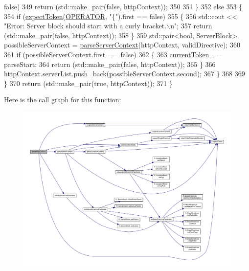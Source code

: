 \begin{DoxyCode}
{      false})
349                     \textcolor{keywordflow}{return} (std::make\_pair(\textcolor{keyword}{false}, httpContext));
350                 
351             \}
352             \textcolor{keywordflow}{else}
353             \{
354                 \textcolor{keywordflow}{if} (\hyperlink{classft_1_1_parser_a1615a752d3642bb53598e2c8db810db0}{expectToken}(\hyperlink{namespaceft_aa520fbf142ba1e7e659590c07da31921a6411d9d6073252e4d316493506bbb979}{OPERATOR}, \textcolor{stringliteral}{"\{"}).first == \textcolor{keyword}{false})
355                 \{
356                     std::cout << \textcolor{stringliteral}{"Error: Server block should start with a curly bracket.\(\backslash\)n"};
357                     \textcolor{keywordflow}{return} (std::make\_pair(\textcolor{keyword}{false}, httpContext));
358                 \}
359                 std::pair<bool, ServerBlock>    possibleServerContext = 
      \hyperlink{classft_1_1_parser_ae53bb700e0344f7af2519a5af3ae4230}{parseServerContext}(httpContext, validDirective);
360 
361                 \textcolor{keywordflow}{if} (possibleServerContext.first == \textcolor{keyword}{false})
362                 \{
363                     \hyperlink{classft_1_1_parser_a942c5b794d108f144c5b5028aaa34cb6}{currentToken\_} = parseStart;
364                     \textcolor{keywordflow}{return} (std::make\_pair(\textcolor{keyword}{false}, httpContext));
365                 \}
366                 httpContext.serverList.push\_back(possibleServerContext.second);
367             \}
368 
369         \}
370         \textcolor{keywordflow}{return} (std::make\_pair(\textcolor{keyword}{true}, httpContext));
371     \}
\end{DoxyCode}
Here is the call graph for this function\+:
\nopagebreak
\begin{figure}[H]
\begin{center}
\leavevmode
\includegraphics[width=350pt]{classft_1_1_parser_a17a213759b2cca8e91ca225b2e86739d_cgraph}
\end{center}
\end{figure}
